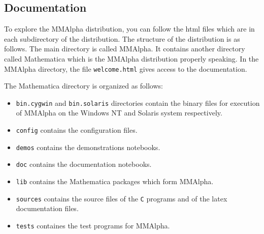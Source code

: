 \documentclass[12pt]{article}
\newcommand{\C}{\texttt{C}}
\newcommand{\MMA}{{\sc MMAlpha}}
\newcommand{\MMAlfa}{\MMA}
\begin{document}
\subsection{Documentation}
To explore the \MMAlfa{} distribution, you can follow the 
html files which are in each subdirectory of the distribution.
The structure of 
the distribution is as follows. The main directory is called \MMAlfa{}. It
contains another directory called Mathematica which is the 
\MMAlfa{} distribution properly speaking. In the \MMAlfa{} directory, 
the file \texttt{welcome.html} gives access to the documentation. 

The Mathematica directory is organized as follows:
\begin{itemize}
\item \texttt{bin.cygwin} and \texttt{bin.solaris} 
directories contain the binary files for execution of \MMAlfa{} on 
the Windows NT and Solaris system respectively. 
\item \texttt{config} contains the configuration files.
\item \texttt{demos} contains the demonstrations notebooks.
\item \texttt{doc} contains the documentation notebooks.
\item \texttt{lib} contains the Mathematica packages which form 
\MMAlfa{}.
\item \texttt{sources} contains the source files of the \C{} programs
and of the latex documentation files. 
\item \texttt{tests} containes the test programs for \MMAlfa{}.
\end{itemize}

\printindex

\newpage
\tableofcontents
\end{document}
